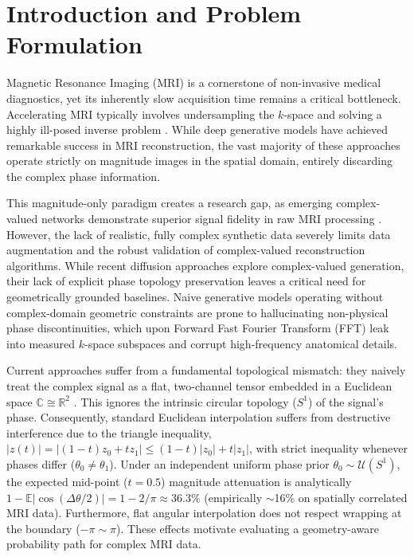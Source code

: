 \section{Introduction and Problem Formulation}
\label{sec:intro}

Magnetic Resonance Imaging (MRI) is a cornerstone of non-invasive medical diagnostics, yet its inherently slow acquisition time remains a critical bottleneck. Accelerating MRI typically involves undersampling the $k$-space and solving a highly ill-posed inverse problem \citep{chung2022score}. While deep generative models have achieved remarkable success in MRI reconstruction, the vast majority of these approaches operate strictly on magnitude images in the spatial domain, entirely discarding the complex phase information.

This magnitude-only paradigm creates a research gap, as emerging complex-valued networks demonstrate superior signal fidelity in raw MRI processing \citep{rempe2026kvit, dou2025mri}. However, the lack of realistic, fully complex synthetic data severely limits data augmentation and the robust validation of complex-valued reconstruction algorithms. While recent diffusion approaches \citep{rempe2025phasegen} explore complex-valued generation, their lack of explicit phase topology preservation leaves a critical need for geometrically grounded baselines. Naive generative models operating without complex-domain geometric constraints are prone to hallucinating non-physical phase discontinuities, which upon Forward Fast Fourier Transform (FFT) leak into measured $k$-space subspaces and corrupt high-frequency anatomical details.

Current approaches suffer from a fundamental topological mismatch: they naively treat the complex signal as a flat, two-channel tensor embedded in a Euclidean space $\mathbb{C} \cong \mathbb{R}^2$ \citep{chung2022score}. This ignores the intrinsic circular topology ($S^1$) of the signal's phase. Consequently, standard Euclidean interpolation suffers from destructive interference due to the triangle inequality, $|z(t)| = |(1-t)z_0 + t z_1| \le (1-t)|z_0| + t|z_1|$, with strict inequality whenever phases differ ($\theta_0 \ne \theta_1$). Under an independent uniform phase prior $\theta_0 \sim \mathcal{U}(S^1)$, the expected mid-point ($t=0.5$) magnitude attenuation is analytically $1 - \mathbb{E}|\cos(\Delta\theta/2)| = 1 - 2/\pi \approx 36.3\%$ (empirically $\sim$16\% on spatially correlated MRI data). Furthermore, flat angular interpolation does not respect wrapping at the boundary ($-\pi \sim \pi$). These effects motivate evaluating a geometry-aware probability path for complex MRI data.


